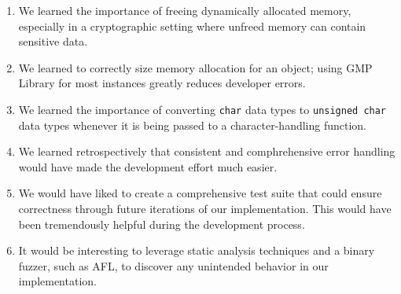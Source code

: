 \documentclass[a4paper]{article}
\begin{document}
\begin{enumerate}
    \item We learned the importance of freeing dynamically allocated memory, especially in a cryptographic setting where unfreed memory can contain sensitive data.
        
    \item We learned to correctly size memory allocation for an object; using GMP Library for most instances greatly reduces developer errors.

    \item We learned the importance of converting {\tt char} data types to {\tt unsigned char} data types whenever it is being passed to a character-handling function.

    \item We learned retrospectively that consistent and comphrehensive error handling would have made the development effort much easier.

    \item We would have liked to create a comprehensive test suite that could ensure correctness through future iterations of our implementation. This would have been tremendously helpful during the development process.

    \item It would be interesting to leverage static analysis techniques and a binary fuzzer, such as AFL, to discover any unintended behavior in our implementation.
\end{enumerate}
\end{document}
